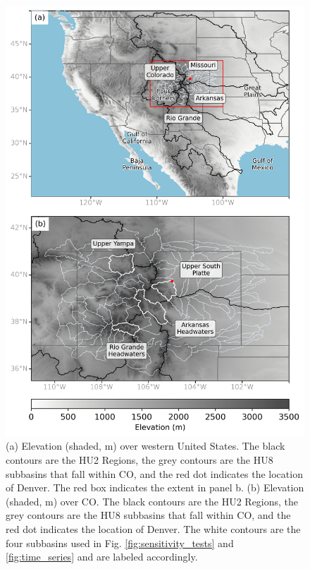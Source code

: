 \documentclass[draft]{agujournal2019}
\begin{document}
\begin{figure}
\noindent\includegraphics[width=\textwidth, height=\textheight, keepaspectratio]{fig1.png}
\caption{(a) Elevation (shaded, m) over western United States. The black contours are the HU2 Regions, the grey contours are the HU8 subbasins that fall within CO, and the red dot indicates the location of Denver. The red box indicates the extent in panel b. (b) Elevation (shaded, m) over CO. The black contours are the HU2 Regions, the grey contours are the HU8 subbasins that fall within CO, and the red dot indicates the location of Denver. The white contours are the four subbasins used in Fig. \ref{fig:sensitivity_tests} and \ref{fig:time_series} and are labeled accordingly. }
\label{fig:elevation}
\end{figure}
\end{document}
